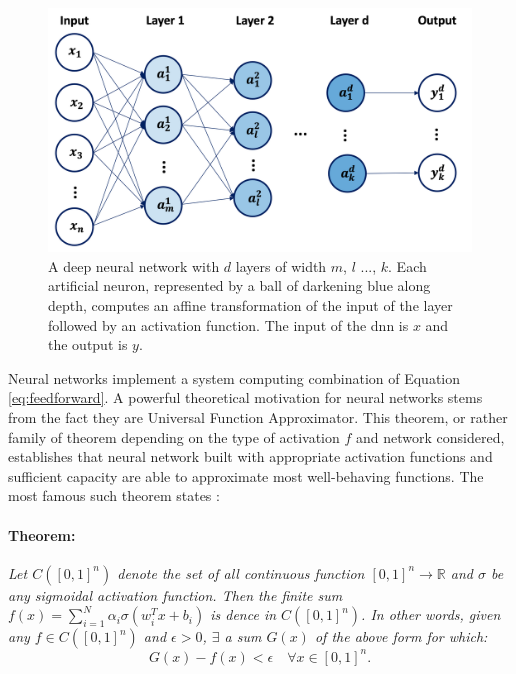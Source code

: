 \begin{figure}[h!]
    \center
    \begin{minipage}[l]{0.38\textwidth}
        \caption{A deep neural network with $d$ layers of width $m$, $l$ ..., $k$. Each artificial neuron, represented by a ball of darkening blue along depth, computes an affine transformation of the input of the layer followed by an activation function. The input of the \gls{dnn} is $x$ and the output is $y$.} 
    \label{fig:neuralnet}
      \end{minipage}
      \begin{minipage}[c]{0.6\textwidth}
        \includegraphics[width=\textwidth]{Images/ML/neuralnet.png}
      \end{minipage}
\end{figure}

Neural networks implement a system computing combination of Equation \ref{eq:feedforward}. A powerful theoretical motivation for neural networks stems from the fact they are Universal Function Approximator. This theorem, or rather family of theorem depending on the type of activation $f$ and network considered, establishes that neural network built with appropriate activation functions and sufficient capacity are able to approximate most well-behaving functions. The most famous such theorem states \cite{universalFuncApproxNN,HORNIK1989359}:

\paragraph{Theorem:} \textit{Let $C([0, 1]^n)$ denote the set of all continuous function $[0, 1]^n \rightarrow \mathbb{R}$ and $\sigma$ be any sigmoidal activation function. Then the finite sum $f(x) = \sum_{i=1}^N \alpha_i \sigma(w_i^T x + b_i)$ is dence in $C([0, 1]^n)$. In other words, given any $f \in C([0, 1]^n)$ and $\epsilon > 0$, $\exists$ a sum $G(x)$ of the above form for which: \[ G(x) - f(x) < \epsilon \quad \forall x \in [0, 1]^n.\]}

